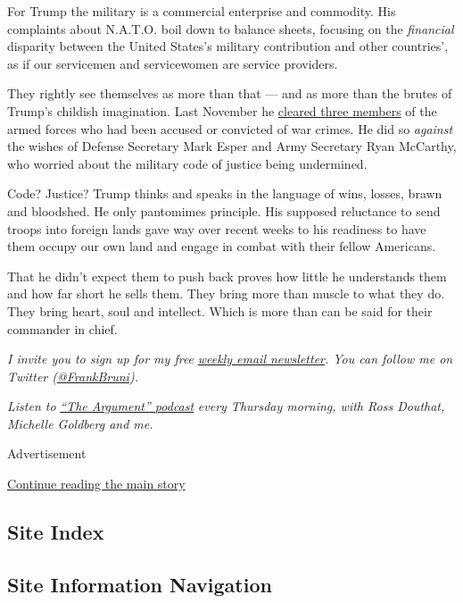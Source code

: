 For Trump the military is a commercial enterprise and commodity. His
complaints about N.A.T.O. boil down to balance sheets, focusing on the
\emph{financial} disparity between the United States's military
contribution and other countries', as if our servicemen and servicewomen
are service providers.

They rightly see themselves as more than that --- and as more than the
brutes of Trump's childish imagination. Last November he
\href{https://www.nytimes.com/2019/11/15/us/trump-pardons.html}{cleared
three members} of the armed forces who had been accused or convicted of
war crimes. He did so \emph{against} the wishes of Defense Secretary
Mark Esper and Army Secretary Ryan McCarthy, who worried about the
military code of justice being undermined.

Code? Justice? Trump thinks and speaks in the language of wins, losses,
brawn and bloodshed. He only pantomimes principle. His supposed
reluctance to send troops into foreign lands gave way over recent weeks
to his readiness to have them occupy our own land and engage in combat
with their fellow Americans.

That he didn't expect them to push back proves how little he understands
them and how far short he sells them. They bring more than muscle to
what they do. They bring heart, soul and intellect. Which is more than
can be said for their commander in chief.

\emph{I invite you to sign up for my free}
\href{https://www.nytimes.com/newsletters/frank-bruni}{\emph{weekly
email newsletter}}\emph{. You can follow me on Twitter
(}\href{https://twitter.com/FrankBruni}{\emph{@FrankBruni}}\emph{).}

\emph{Listen to}
\href{https://www.nytimes.com/column/the-argument}{\emph{``The
Argument'' podcast}} \emph{every Thursday morning, with Ross Douthat,
Michelle Goldberg and me.}

Advertisement

\protect\hyperlink{after-bottom}{Continue reading the main story}

\hypertarget{site-index}{%
\subsection{Site Index}\label{site-index}}

\hypertarget{site-information-navigation}{%
\subsection{Site Information
Navigation}\label{site-information-navigation}}

